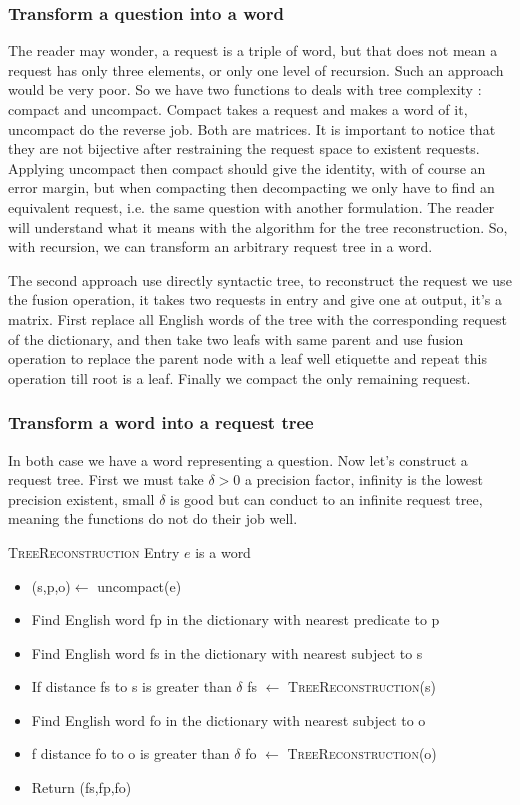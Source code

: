 \subsubsection{Transform a question into a word}

The reader may wonder, a request is a triple of word, but that does not mean a request has only three elements, or only one level of recursion. Such an approach would be very poor. So we have two functions to deals with tree complexity : compact and uncompact. Compact takes a request and makes a word of it, uncompact do the reverse job. Both are matrices. It is important to notice that they are not bijective after restraining the request space to existent requests. Applying uncompact then compact should give the identity, with of course an error margin, but when compacting then decompacting we only have to find an equivalent request, i.e. the same question with another formulation. The reader will understand what it means with the algorithm for the tree reconstruction. So, with recursion, we can transform an arbitrary request tree in a word.

The second approach use directly syntactic tree, to reconstruct the request we use the fusion operation, it takes two requests in entry and give one at output, it's a matrix. First replace all English words of the tree with the corresponding request of the dictionary, and then take two leafs with same parent and use fusion operation to replace the parent node with a leaf well etiquette and repeat this operation till root is a leaf. Finally we compact the only remaining request. 

\subsubsection{Transform a word into a request tree}

In both case we have a word representing a question. Now let's construct a request tree. First we must take $\delta>0$ a precision factor, infinity is the lowest precision existent, small $\delta$ is good but can conduct to an infinite request tree, meaning the functions do not do their job well.

\textsc{TreeReconstruction}
Entry $e$ is a word

\begin{itemize}
\item (s,p,o)$\leftarrow$ uncompact(e)
\item Find English word fp in the dictionary with nearest predicate to p
\item Find English word fs in the dictionary with nearest subject to s
\item If distance fs to s is greater than $\delta$ fs $\leftarrow$ \textsc{TreeReconstruction}(s)
\item Find English word fo in the dictionary with nearest subject to o
\item f distance fo to o is greater than $\delta$ fo $\leftarrow$ \textsc{TreeReconstruction}(o)
\item Return (fs,fp,fo)
\end{itemize}


